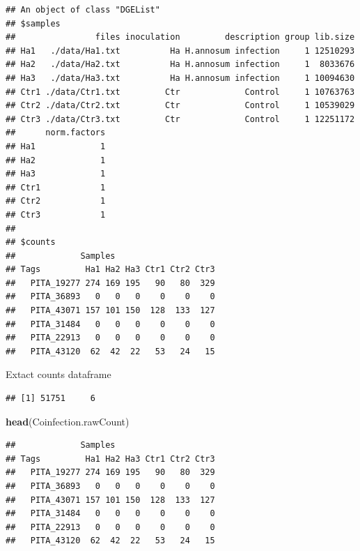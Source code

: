\documentclass[
]{article}
\newenvironment{Shaded}{\begin{snugshade}}{\end{snugshade}}
\newcommand{\FunctionTok}[1]{\textcolor[rgb]{0.13,0.29,0.53}{\textbf{#1}}}
\newcommand{\NormalTok}[1]{#1}
\newcommand{\OtherTok}[1]{\textcolor[rgb]{0.56,0.35,0.01}{#1}}
\newcommand{\SpecialCharTok}[1]{\textcolor[rgb]{0.81,0.36,0.00}{\textbf{#1}}}
\begin{document}
\begin{verbatim}
## An object of class "DGEList"
## $samples
##                files inoculation         description group lib.size
## Ha1   ./data/Ha1.txt          Ha H.annosum infection     1 12510293
## Ha2   ./data/Ha2.txt          Ha H.annosum infection     1  8033676
## Ha3   ./data/Ha3.txt          Ha H.annosum infection     1 10094630
## Ctr1 ./data/Ctr1.txt         Ctr             Control     1 10763763
## Ctr2 ./data/Ctr2.txt         Ctr             Control     1 10539029
## Ctr3 ./data/Ctr3.txt         Ctr             Control     1 12251172
##      norm.factors
## Ha1             1
## Ha2             1
## Ha3             1
## Ctr1            1
## Ctr2            1
## Ctr3            1
## 
## $counts
##             Samples
## Tags         Ha1 Ha2 Ha3 Ctr1 Ctr2 Ctr3
##   PITA_19277 274 169 195   90   80  329
##   PITA_36893   0   0   0    0    0    0
##   PITA_43071 157 101 150  128  133  127
##   PITA_31484   0   0   0    0    0    0
##   PITA_22913   0   0   0    0    0    0
##   PITA_43120  62  42  22   53   24   15
\end{verbatim}

Extact counts dataframe

\begin{Shaded}
\end{Shaded}

\begin{verbatim}
## [1] 51751     6
\end{verbatim}

\begin{Shaded}
\begin{Highlighting}[]
\FunctionTok{head}\NormalTok{(Coinfection.rawCount)}
\end{Highlighting}
\end{Shaded}

\begin{verbatim}
##             Samples
## Tags         Ha1 Ha2 Ha3 Ctr1 Ctr2 Ctr3
##   PITA_19277 274 169 195   90   80  329
##   PITA_36893   0   0   0    0    0    0
##   PITA_43071 157 101 150  128  133  127
##   PITA_31484   0   0   0    0    0    0
##   PITA_22913   0   0   0    0    0    0
##   PITA_43120  62  42  22   53   24   15
\end{verbatim}
\end{document}
